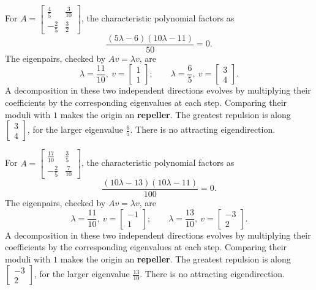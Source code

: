 For $A=\left[\begin{matrix}\frac{4}{5} & \frac{3}{10}\\- \frac{2}{5} & \frac{3}{2}\end{matrix}\right]$, the characteristic polynomial factors as
\[\frac{\left(5 \lambda - 6\right) \left(10 \lambda - 11\right)}{50}=0.\]
The eigenpairs, checked by $Av=\lambda v$, are
\[\lambda=\frac{11}{10},\ v=\left[\begin{matrix}1\\1\end{matrix}\right];\qquad
\lambda=\frac{6}{5},\ v=\left[\begin{matrix}3\\4\end{matrix}\right].\]
A decomposition in these two independent directions evolves by
multiplying their coefficients by the corresponding eigenvalues at
each step. Comparing their moduli with $1$ makes the origin an
\textbf{repeller}. The greatest repulsion is along $\left[\begin{matrix}3\\4\end{matrix}\right]$, for the larger eigenvalue $\frac{6}{5}$. There is no attracting eigendirection.

For $A=\left[\begin{matrix}\frac{17}{10} & \frac{3}{5}\\- \frac{2}{5} & \frac{7}{10}\end{matrix}\right]$, the characteristic polynomial factors as
\[\frac{\left(10 \lambda - 13\right) \left(10 \lambda - 11\right)}{100}=0.\]
The eigenpairs, checked by $Av=\lambda v$, are
\[\lambda=\frac{11}{10},\ v=\left[\begin{matrix}-1\\1\end{matrix}\right];\qquad
\lambda=\frac{13}{10},\ v=\left[\begin{matrix}-3\\2\end{matrix}\right].\]
A decomposition in these two independent directions evolves by
multiplying their coefficients by the corresponding eigenvalues at
each step. Comparing their moduli with $1$ makes the origin an
\textbf{repeller}. The greatest repulsion is along $\left[\begin{matrix}-3\\2\end{matrix}\right]$, for the larger eigenvalue $\frac{13}{10}$. There is no attracting eigendirection.

